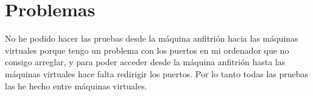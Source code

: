 
\section{Problemas}
No he podido hacer las pruebas desde la máquina anfitrión hacia las máquinas virtuales porque tengo un problema con los puertos en mi ordenador que no consigo arreglar, y para poder acceder desde la máquina anfitrión hasta las máquinas virtuales hace falta redirigir los puertos. Por lo tanto todas las pruebas las he hecho entre máquinas virtuales.





